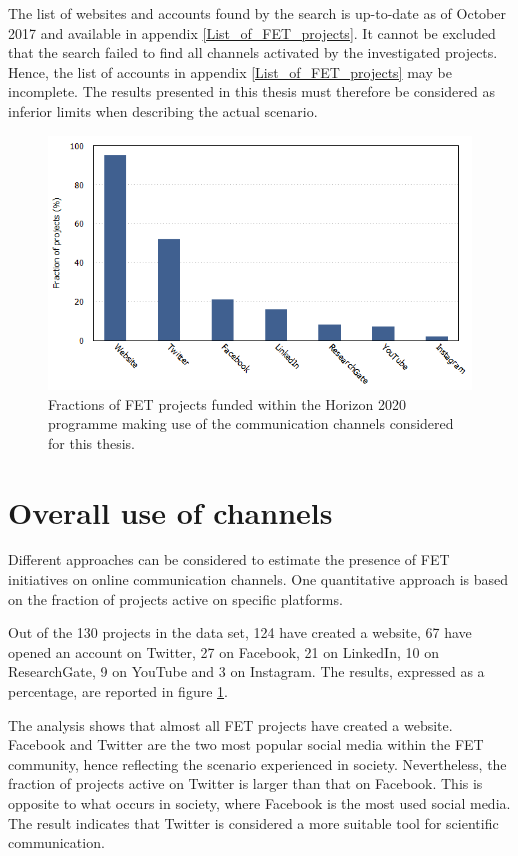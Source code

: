 The list of websites and accounts found by the search is up-to-date as of October 2017 and available in appendix \ref{List_of_FET_projects}. It cannot be excluded that the search failed to find all channels activated by the investigated projects. Hence, the list of accounts in appendix \ref{List_of_FET_projects} may be incomplete. The results presented in this thesis must therefore be considered as inferior limits when describing the actual scenario. 

\begin{figure}[!t] 
 \begin{center}
 \includegraphics[scale=0.47]{Images/Social_media.png}
 \caption{Fractions of FET projects funded within the Horizon 2020 programme making use of the communication channels considered for this thesis.}
 \label{Social_media}
 \end{center}
\end{figure}

\section{Overall use of channels} \label{Overall_use_of_channels}
Different approaches can be considered to estimate the presence of FET initiatives on online communication channels. One quantitative approach is based on the fraction of projects active on specific platforms.

Out of the 130 projects in the data set, 124 have created a website, 67 have opened an account on Twitter, 27 on Facebook, 21 on LinkedIn, 10 on ResearchGate, 9 on YouTube and 3 on Instagram. The results, expressed as a percentage, are reported in figure \ref{Social_media}.

The analysis shows that almost all FET projects have created a website. Facebook and Twitter are the two most popular social media within the FET community, hence reflecting the scenario experienced in society. Nevertheless, the fraction of projects active on Twitter is larger than that on Facebook. This is opposite to what occurs in society, where Facebook is the most used social media. The result indicates that Twitter is considered a more suitable tool for scientific communication. 

